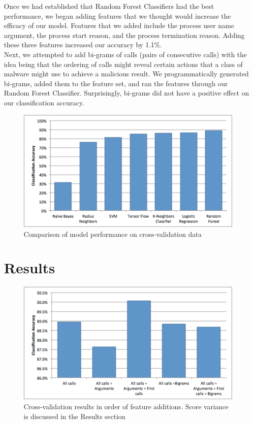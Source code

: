 \documentclass[11pt]{article}
\begin{document}
Once we had established that Random Forest Classifiers had the best performance, we began adding features that we thought would increase the efficacy of our model. Features that we added include the process user name argument, the process start reason, and the process termination reason. Adding these three features increased our accuracy by 1.1\%.\\

Next, we attempted to add bi-grams of calls (pairs of consecutive calls) with the idea being that the ordering of calls might reveal certain actions that a class of malware might use to achieve a malicious result. We programmatically generated bi-grams, added them to the feature set, and ran the features through our Random Forest Classifier. Surprisingly, bi-grams did not have a positive effect on our classification accuracy.\\

\begin{figure}[t]
\centering
\includegraphics[width=12cm]{model_performance}
\caption{Comparison of model performance on cross-validation data}
\label{fig:model_performance}
\end{figure}

\section{Results}

\begin{figure}[t]
\centering
\includegraphics[width=12cm]{result_process}
\caption{Cross-validation results in order of feature additions. Score variance is discussed in the Results section}
\label{fig:result_process}
\end{figure}
\end{document}
